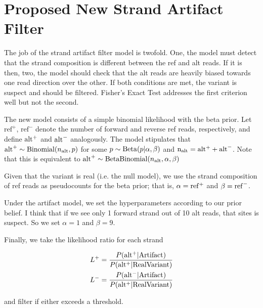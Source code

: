 \documentclass[11pt]{article}
\begin{document}

\section{Proposed New Strand Artifact Filter}

\bigbreak \noindent
The job of the strand artifact filter model is twofold. One, the model must detect that the strand composition is different between the ref and alt reads. If it is then, two, the model should check that the alt reads are heavily biased towards one read direction over the other. If both conditions are met, the variant is suspect and should be filtered. Fisher's Exact Test addresses the first criterion well but not the second. 

\bigbreak \noindent
The new model consists of a simple binomial likelihood with the beta prior. Let $\mathrm{ref}^+$, $\mathrm{ref}^-$ denote the number of forward and reverse ref reads, respectively, and define ${\rm alt^+}$ and ${\rm alt}^-$ analogously. The model stipulates that $\mathrm{alt}^+ \sim {\rm Binomial}(n_{\rm alt}, p)$ for some $p \sim {\rm Beta}(p|\alpha, \beta)$ and ${\rm n_{\rm alt}} = {\rm alt^+} + {\rm alt}^-$. Note that this is equivalent to $\mathrm{alt}^+ \sim {\rm BetaBinomial}(n_{\rm alt}, \alpha, \beta)$

\bigbreak \noindent
Given that the variant is real (i.e. the null model),  we use the strand composition of ref reads as pseudocounts for the beta prior; that is, $\alpha = {\rm ref^+}$ and $\beta = {\rm ref}^-$. 

\bigbreak \noindent
Under the artifact model, we set the hyperparameters according to our prior belief. I think that if we see only 1 forward strand out of 10 alt reads, that sites is suspect. So we set $\alpha = 1$ and $\beta = 9$.

\bigbreak \noindent
Finally, we take the likelihood ratio for each strand 

\begin{align*}
L^+ = \frac{P({\rm alt^+ | {\rm Artifact}})}{P({\rm alt^+ | {\rm Real Variant}})} \\
L^- = \frac{P({\rm alt^- | {\rm Artifact}})}{P({\rm alt^+ | {\rm Real Variant}})}
\end{align*}

and filter if either exceeds a threshold.





\end{document}
